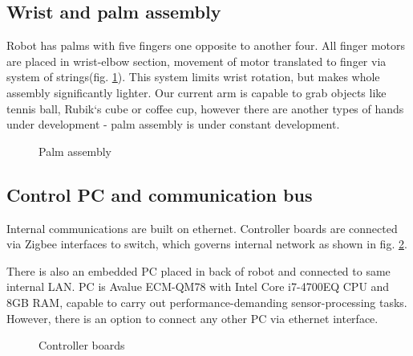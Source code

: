 \documentclass[letterpaper, 10 pt, conference]{ieeeconf}  %
\begin{document}
\subsection{Wrist and palm assembly}
Robot has palms with five fingers one opposite to another four. All
finger motors are placed in wrist-elbow section, movement of motor translated to finger
via system of strings(fig. \ref{img:wrist}). This system limits wrist rotation,
but makes whole assembly significantly lighter. Our current arm is capable to grab objects like
tennis ball, Rubik`s cube or coffee cup, however there are
another types of hands under development - palm assembly is under
constant development.

\begin{figure}[h]
\caption{Palm assembly}
\label{img:wrist}
\end{figure}  

\subsection{Control PC and communication bus}

Internal communications are built on ethernet. Controller boards are connected
via Zigbee interfaces to switch, which governs internal network as shown
in fig. \ref{img:network}.

There is also an embedded PC placed in back of robot and connected to same internal LAN. PC is
Avalue ECM-QM78 with Intel Core i7-4700EQ CPU and 8GB RAM, capable to carry out
performance-demanding sensor-processing tasks. However, there is an option to
connect any other PC via ethernet interface.

\begin{figure}[h]
\caption{Controller boards}
\label{img:network}
\end{figure}  
\end{document}
